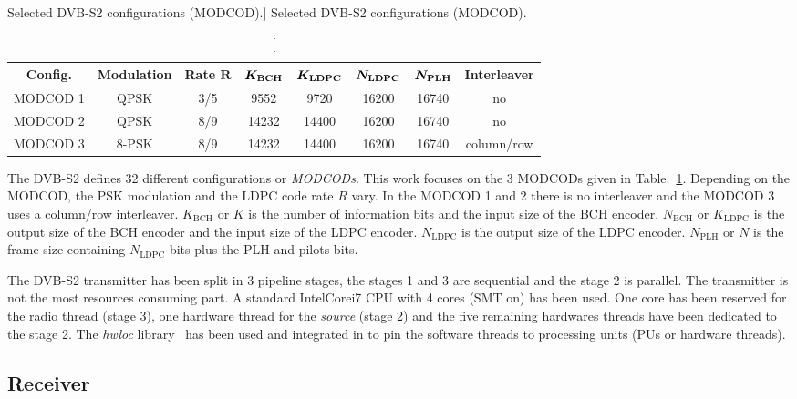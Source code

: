 \begin{table}[htp]
  \centering
  \caption
    [Selected DVB-S2 configurations (MODCOD).]
    {Selected DVB-S2 configurations (MODCOD).}
  \label{tab:dvbs2_modcod}
  \begin{tabular}{c c c c c c c c}
    \textbf{Config.} & \textbf{Modulation} & \textbf{Rate} $\bm{R}$ & $\bm{K_\text{\textbf{BCH}}}$ & $\bm{K_\text{\textbf{LDPC}}}$ & $\bm{N_\text{\textbf{LDPC}}}$ & $\bm{N_\text{\textbf{PLH}}}$ & \textbf{Interleaver}\\
    \hline \hline
    MODCOD 1 &  QPSK & 3/5 &  9552 &  9720 & 16200 & 16740 & no\\
    MODCOD 2 &  QPSK & 8/9 & 14232 & 14400 & 16200 & 16740 & no\\
    MODCOD 3 & 8-PSK & 8/9 & 14232 & 14400 & 16200 & 16740 & column/row\\
  \end{tabular}
\end{table}

The DVB-S2 defines 32 different configurations or \emph{MODCODs}. This work
focuses on the 3 MODCODs given in Table.~\ref{tab:dvbs2_modcod}. Depending on
the MODCOD, the PSK modulation and the LDPC code rate $R$ vary. In the MODCOD 1
and 2 there is no interleaver and the MODCOD 3 uses a column/row interleaver.
$K_\text{BCH}$ or $K$ is the number of information bits and the input size of
the BCH encoder. $N_\text{BCH}$ or $K_\text{LDPC}$ is the output size of the
BCH encoder and the input size of the LDPC encoder. $N_\text{LDPC}$ is the
output size of the LDPC encoder. $N_\text{PLH}$ or $N$ is the frame size
containing $N_\text{LDPC}$ bits plus the PLH and pilots bits.

The DVB-S2 transmitter has been split in 3 pipeline stages, the stages 1 and 3
are sequential and the stage 2 is parallel. The transmitter is not the most
resources consuming part. A standard Intel\R Core\TM i7 CPU with 4 cores (SMT
on) has been used. One core has been reserved for the radio thread (stage 3),
one hardware thread for the \emph{source} (stage 2) and the five
remaining hardwares threads have been dedicated to the stage 2. The \emph{hwloc}
library~\cite{Broquedis2010} has been used and integrated in \AFFECT to pin the
software threads to processing units (PUs or hardware threads).

\subsection{Receiver}

